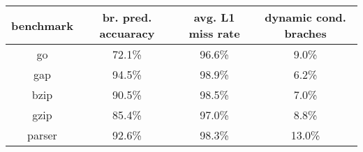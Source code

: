 \begin{tabular}{|c|c|c|c|}
\hline 
benchmark&
br. pred. accuaracy&
avg. L1 miss rate&
dynamic cond. braches\\
\hline
\hline 
go&
72.1\%&
96.6\%&
9.0\%\\
\hline 
gap&
94.5\%&
98.9\%&
6.2\%\\
\hline 
bzip&
90.5\%&
98.5\%&
7.0\%\\
\hline 
gzip&
85.4\%&
97.0\%&
8.8\%\\
\hline 
parser&
92.6\%&
98.3\%&
13.0\%\\
\hline
\end{tabular}

